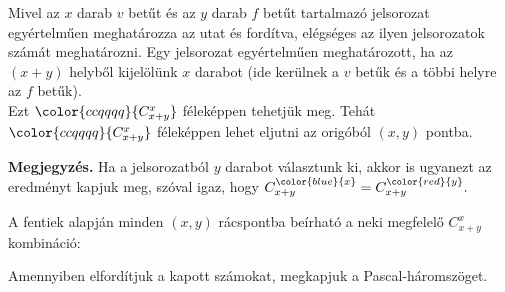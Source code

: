 Mivel az $x$ darab $v$ betűt és az $y$ darab $f$ betűt tartalmazó
jelsorozat \textcolor{ccqqqq}{egyértelműen meghatározza az utat
és fordítva}, elégséges az ilyen jelsorozatok számát meghatározni.
Egy jelsorozat egyértelműen meghatározott, ha az $(x+y)$ helyből
kijelölünk $x$ darabot (ide kerülnek a $v$ betűk és a többi helyre
az $f$ betűk). \\
 Ezt ${\color{ccqqqq}{C_{x+y}^{x}}}$ féleképpen tehetjük meg. Tehát
${\color{ccqqqq}{C_{x+y}^{x}}}$ féleképpen lehet eljutni az origóból
$(x,y)$ pontba.

\textbf{Megjegyzés.} Ha a jelsorozatból $y$ darabot választunk ki,
akkor is ugyanezt az eredményt kapjuk meg, szóval igaz, hogy $C_{x+y}^{{\color{blue}{x}}}=C_{x+y}^{{\color{red}{y}}}.$

A fentiek alapján minden $(x,y)$ rácspontba beírható a neki megfelelő
$C_{x+y}^{x}$ kombináció: 
\begin{center}
\par\end{center}

Amennyiben elfordítjuk a kapott számokat, megkapjuk a \textcolor{ccqqqq}{Pascal-háromszöget.}

